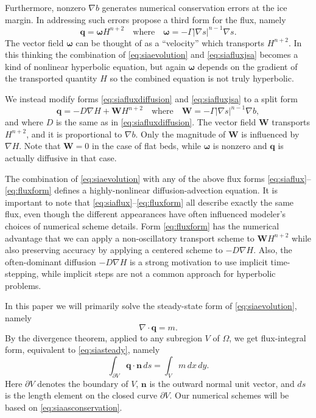 \documentclass[review,letterpaper]{igs}
\newcommand\bn{\mathbf{n}}
\newcommand\bq{\mathbf{q}}
\newcommand\bW{\mathbf{W}}
\newcommand{\Div}{\nabla\cdot}
\newcommand{\grad}{\nabla}
\begin{document}
Furthermore, nonzero $\grad b$ generates numerical conservation errors at the ice margin.  In addressing such errors \cite{JaroschSchoofAnslow2013} propose a third form for the flux, namely
\begin{equation}
   \bq = \boldsymbol{\omega} H^{n+2} \quad \text{where} \quad \boldsymbol{\omega} = - \Gamma |\grad s|^{n-1} \grad s. \label{eq:siafluxjsa}
\end{equation}
The vector field $\boldsymbol{\omega}$ can be thought of as a ``velocity'' which transports $H^{n+2}$.  In this thinking the combination of \eqref{eq:siaevolution} and \eqref{eq:siafluxjsa} becomes a kind of nonlinear hyperbolic equation, but again $\boldsymbol{\omega}$ depends on the gradient of the transported quantity $H$ so the combined equation is not truly hyperbolic.

We instead modify forms \eqref{eq:siafluxdiffusion} and \eqref{eq:siafluxjsa} to a split form
\begin{equation}
\bq = - D \grad H + \bW H^{n+2} \quad \text{where} \quad \bW = - \Gamma |\grad s|^{n-1} \grad b, \label{eq:fluxform}
\end{equation}
and where $D$ is the same as in \eqref{eq:siafluxdiffusion}.  The vector field $\bW$ transports $H^{n+2}$, and it is proportional to $\grad b$.  Only the magnitude of $\bW$ is influenced by $\grad H$.  Note that $\bW=0$ in the case of flat beds, while $\boldsymbol{\omega}$ is nonzero and $\bq$ is actually diffusive in that case.

The combination of \eqref{eq:siaevolution} with any of the above flux forms \eqref{eq:siaflux}--\eqref{eq:fluxform} defines a highly-nonlinear diffusion-advection equation.  It is important to note that \eqref{eq:siaflux}--\eqref{eq:fluxform} all describe exactly the same flux, even though the different appearances have often influenced modeler's choices of numerical scheme details.  Form \eqref{eq:fluxform} has the numerical advantage that we can apply a non-oscillatory transport scheme to $\bW H^{n+2}$ while also preserving accuracy by applying a centered scheme to $-D \grad H$.  Also, the often-dominant diffusion $-D \grad H$ is a strong motivation to use implicit time-stepping, while implicit steps are not a common approach for hyperbolic problems.

In this paper we will primarily solve the steady-state form of \eqref{eq:siaevolution}, namely
\begin{equation}
\Div \bq = m.  \label{eq:siasteady}
\end{equation}
By the divergence theorem, applied to any subregion $V$ of $\Omega$, we get flux-integral form, equivalent to \eqref{eq:siasteady}, namely
\begin{equation}
  \int_{\partial V} \bq \cdot \bn\,ds = \int_V m\, dx\,dy. \label{eq:siaasconservation}
\end{equation}
Here $\partial V$ denotes the boundary of $V$, $\bn$ is the outward normal unit vector, and $ds$ is the length element on the closed curve $\partial V$.  Our numerical schemes will be based on \eqref{eq:siaasconservation}.
\end{document}
